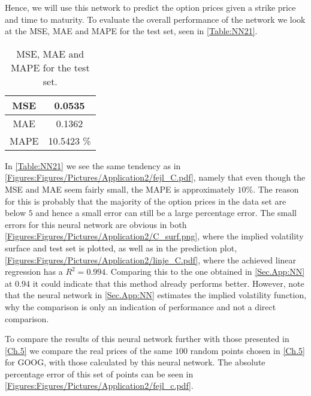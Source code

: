 
Hence, we will use this network to predict the option prices given a strike price and time to maturity. To evaluate the overall performance of the network we look at the MSE, MAE and MAPE for the test set, seen in \autoref{Table:NN21}.

\begin{table}[H]
    \centering
    {\renewcommand{\arraystretch}{1.25}\begin{tabular}{c|c}
        MSE  &  0.0535\\ \hline
        MAE  &  0.1362\\ \hline
        MAPE &  10.5423 \%\\ 
    \end{tabular}}
    \caption{MSE, MAE and MAPE for the test set.}
    \label{Table:NN21}
\end{table}

In \autoref{Table:NN21} we see the same tendency as in \autoref{Figures:Figures/Pictures/Application2/fejl_C.pdf}, namely that even though the MSE and MAE seem fairly small, the MAPE is approximately $10\%$. The reason for this is probably that the majority of the option prices in the data set are below $5$ and hence a small error can still be a large percentage error. The small errors for this neural network are obvious in both \autoref{Figures:Figures/Pictures/Application2/C_surf.png}, where the implied volatility surface and test set is plotted, as well as in the prediction plot, \autoref{Figures:Figures/Pictures/Application2/linje_C.pdf}, where the achieved linear regression has a $R^2=0.994$. Comparing this to the one obtained in \autoref{Sec.App:NN} at $0.94$ it could indicate that this method already performs better. However, note that the neural network in \autoref{Sec.App:NN} estimates the implied volatility function, why the comparison is only an indication of performance and not a direct comparison.


To compare the results of this neural network further with those presented in \autoref{Ch.5} we compare the real prices of the same $100$ random points chosen in \autoref{Ch.5} for GOOG, with those calculated by this neural network. The absolute percentage error of this set of points can be seen in \autoref{Figures:Figures/Pictures/Application2/fejl_c.pdf}.

